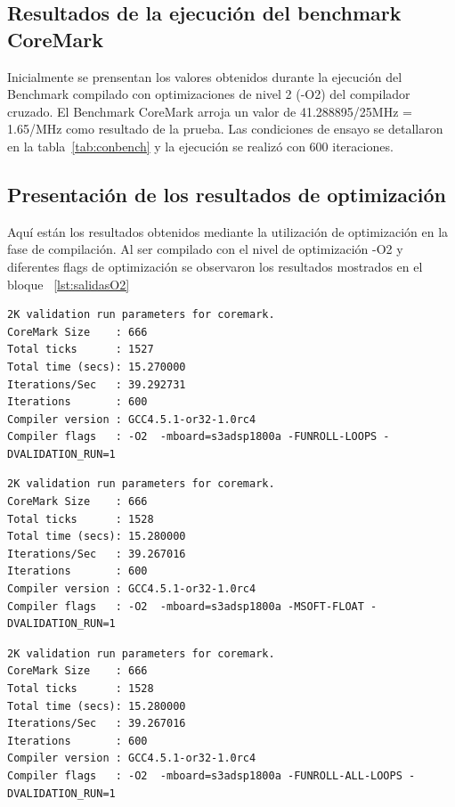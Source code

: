 		\subsection{Resultados de la ejecución del benchmark CoreMark}
		
Inicialmente se prensentan los valores obtenidos durante la ejecución del Benchmark compilado con optimizaciones de nivel 2 (-O2) del
compilador cruzado. El Benchmark CoreMark arroja un valor de  41.288895/25MHz = 1.65/MHz como resultado de la prueba. Las condiciones de ensayo se
detallaron en la tabla~\ref{tab:conbench} y la ejecución se realizó con 600 iteraciones. 


	\subsection {Presentación de los resultados de optimización} 
	
Aquí están los resultados obtenidos mediante la utilización de optimización en la fase de compilación. Al ser compilado con el nivel de optimización
-O2 y diferentes flags de optimización se observaron los resultados mostrados en el bloque ~\ref{lst:salidasO2}

\begin{lstlisting}[frame=single,caption={Optimización nivel -O2 - Flags activos : -FUNROLL-LOOPS },label={lst:salidasO2},breaklines]
2K validation run parameters for coremark.
CoreMark Size    : 666
Total ticks      : 1527
Total time (secs): 15.270000
Iterations/Sec   : 39.292731
Iterations       : 600
Compiler version : GCC4.5.1-or32-1.0rc4
Compiler flags   : -O2  -mboard=s3adsp1800a -FUNROLL-LOOPS -DVALIDATION_RUN=1  
\end{lstlisting}

\begin{lstlisting}[frame=single,caption={Optimización nivel -O2 - Flags activos : -MSOFT-FLOAT},label={lst:salidas},breaklines]
2K validation run parameters for coremark.
CoreMark Size    : 666
Total ticks      : 1528
Total time (secs): 15.280000
Iterations/Sec   : 39.267016
Iterations       : 600
Compiler version : GCC4.5.1-or32-1.0rc4
Compiler flags   : -O2  -mboard=s3adsp1800a -MSOFT-FLOAT -DVALIDATION_RUN=1  
\end{lstlisting}

\begin{lstlisting}[frame=single,caption={Optimización nivel -O2 - Flags activos : -FUNROLL-ALL-LOOPS},label={lst:salidas},breaklines]
2K validation run parameters for coremark.
CoreMark Size    : 666
Total ticks      : 1528
Total time (secs): 15.280000
Iterations/Sec   : 39.267016
Iterations       : 600
Compiler version : GCC4.5.1-or32-1.0rc4
Compiler flags   : -O2  -mboard=s3adsp1800a -FUNROLL-ALL-LOOPS -DVALIDATION_RUN=1  
\end{lstlisting}


